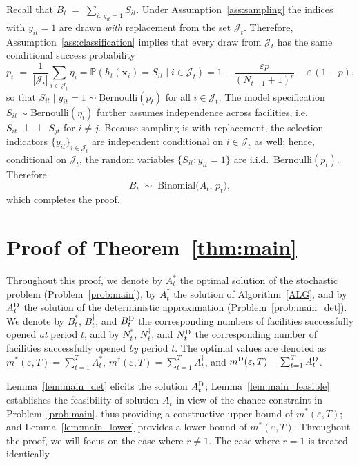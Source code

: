 \documentclass[nonblindrev]{informs3noheader}
\def\P{\mathbb{P}}
\def\calJ{\mathcal{J}}
\def\bx{\boldsymbol{x}}
\begin{document}
Recall that $B_t \;=\; \sum_{i:\,y_{it}=1} S_{it}$. Under Assumption~\ref{ass:sampling} the indices with $y_{it}=1$ are drawn
\emph{with} replacement from the set
$\calJ_t$. Therefore, Assumption~\ref{ass:classification} implies that every draw from
$\calJ_t$ has the same conditional success probability
\[
  p_t \;=\; \frac{1}{|\calJ_t|} \sum_{i \in \calJ_t} \eta_i = \P(h_t(\bx_i) = S_{it} \mid i \in \calJ_t)=1-\frac{\varepsilon p}{(N_{t-1}+1)^{r}}-\varepsilon\,(1-p),
\]
so that $S_{it} \mid y_{it} = 1 \sim \text{Bernoulli}(p_t)$ for all $i\in\calJ_t$.
The model specification $S_{it} \sim \text{Bernoulli}(\eta_i)$ further
assumes independence across facilities, i.e.\ $S_{it}\;\perp \!\!\! \perp\;S_{jt}$ for
$i\neq j$.
Because sampling is with replacement, the selection indicators
$\{y_{it}\}_{i\in\calJ_t}$ are independent conditional on $i \in \calJ_t$ as well; hence, conditional on
$\calJ_t$, the random variables
$\{S_{it}:y_{it}=1\}$ are i.i.d.\ $\text{Bernoulli}(p_t)$.
Therefore
\[
  B_t \;\sim\; \text{Binomial}\bigl(A_t,\,p_t\bigr),
\]
which completes the proof.
\hfill\Halmos

\section{Proof of Theorem~\ref{thm:main}}
\label{app:base}

Throughout this proof, we denote by $A^*_{t}$ the optimal solution of the stochastic problem (Problem~\eqref{prob:main}), by $A^\dagger_{t}$ the solution of Algorithm~\ref{ALG}, and by $A^{\textsc{D}}_{t}$ the solution of the deterministic approximation (Problem~\eqref{prob:main_det}). We denote by $B^*_{t}$, $B^\dagger_{t}$, and $B^{\textsc{D}}_{t}$ the corresponding numbers of facilities successfully opened \emph{at} period $t$, and by $N^*_{t}$, $N^\dagger_{t}$, and $N^{\textsc{D}}_{t}$ the corresponding number of facilities successfully opened \emph{by} period $t$. The optimal values are denoted as $m^*(\varepsilon, T)=\sum_{t=1}^T A^*_{t}$, $m^\dagger(\varepsilon, T)=\sum_{t=1}^T A^\dagger_{t}$, and $m^{\textsc{D}}(\varepsilon, T)=\sum_{t=1}^T A^{\textsc{D}}_{t}$.

Lemma~\ref{lem:main_det} elicits the solution $A^{\textsc{D}}_{t}$; Lemma~\ref{lem:main_feasible} establishes the feasibility of solution $A^\dagger_{t}$ in view of the chance constraint in Problem~\eqref{prob:main}, thus providing a constructive upper bound of $m^*(\varepsilon, T)$; and Lemma~\ref{lem:main_lower} provides a lower bound of $m^*(\varepsilon, T)$. Throughout the proof, we will focus on the case where $r\neq 1$. The case where $r=1$ is treated identically.
\end{document}
